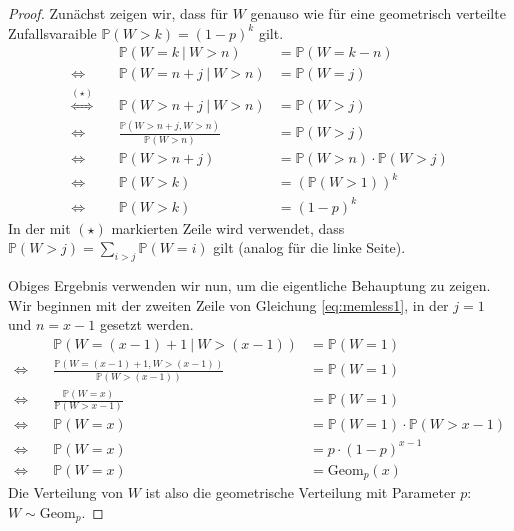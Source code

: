 \documentclass[a4paper]{scrartcl}
\newcommand{\gdw}{\Leftrightarrow}
\newcommand{\prob}{\mathbb{P}}
\begin{document}
\begin{enumerate}[label=\bfseries 1.\arabic*]
\begin{proof}
            Zunächst zeigen wir, dass für $W$ genauso wie für eine geometrisch
            verteilte Zufallsvaraible $\prob(W > k) = (1-p)^k$ gilt.
            \begin{equation}
                \begin{alignedat}{2}
                    && \prob(W = k \ |\  W > n) &= \prob(W = k-n) \\
                    \gdw\ && \prob(W = n+j \ |\  W > n) &= \prob(W = j) \\
                    \stackrel{(\star)}{\gdw}\ && 
                    \prob(W > n+j \ |\  W > n) &= \prob(W > j) \\
                    \gdw\ && \frac{\prob(W > n+j,  W > n)}{\prob(W > n)}
                          &= \prob(W > j) \\
                    \gdw\ && \prob(W > n+j)
                          &= \prob(W > n) \cdot \prob(W > j) \\
                    \gdw\ && \prob(W > k) &= (\prob(W > 1))^k \\
                    \gdw\ && \prob(W > k) &= (1-p)^k
                \end{alignedat}
                \label{eq:memless1}
            \end{equation}
            In der mit $(\star)$ markierten Zeile wird verwendet, dass $\prob(W
            > j) = \sum_{i > j} \prob(W = i)$ gilt (analog für die linke
            Seite).

            Obiges Ergebnis verwenden wir nun, um die eigentliche Behauptung zu
            zeigen. Wir beginnen mit der zweiten Zeile von Gleichung
            \eqref{eq:memless1}, in der $j = 1$ und $n = x-1$ gesetzt werden.
            \begin{equation*}
                \begin{alignedat}{2}
                          && \prob(W = (x-1) + 1 \ |\  W > (x-1))
                          &= \prob(W = 1) \\
                    \gdw\ && \frac{\prob(W = (x-1) + 1, W > (x-1))}
                                  {\prob(W > (x-1))}
                          &= \prob(W = 1) \\
                    \gdw\ && \frac{\prob(W = x)}{\prob(W > x-1)}
                          &= \prob(W = 1) \\
                    \gdw\ && \prob(W = x)
                          &= \prob(W = 1) \cdot \prob(W > x-1) \\
                    \gdw\ && \prob(W = x)
                          &= p \cdot (1-p)^{x-1} \\
                    \gdw\ && \prob(W = x)
                          &= \text{Geom}_p(x)
                \end{alignedat}
            \end{equation*}
            Die Verteilung von $W$ ist also die geometrische Verteilung mit
            Parameter $p$: $W \sim \text{Geom}_p$.
        \end{proof}

\end{enumerate}
\end{document}
